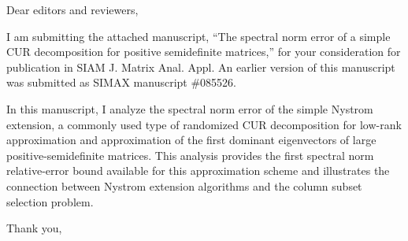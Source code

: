 \documentclass[letterpaper,10pt]{letter}
\begin{document}

\begin{letter}{}

\opening{Dear editors and reviewers,}

I am submitting the attached manuscript, ``The spectral norm error of a simple CUR decomposition for positive semidefinite matrices,'' for your consideration for publication in SIAM J. Matrix Anal. Appl.
An earlier version of this manuscript was submitted as SIMAX manuscript \#085526.

In this manuscript, I analyze the spectral norm error of the simple Nystrom extension, a commonly used type of randomized CUR decomposition for low-rank approximation and approximation of the first dominant eigenvectors of large positive-semidefinite matrices. This analysis provides the first spectral norm relative-error bound available for this approximation scheme and illustrates the connection between Nystrom extension algorithms and the column subset selection problem.

\signature{Alex Gittens}

\closing{Thank you,}


\end{letter}
\end{document}
